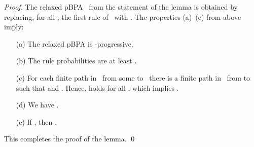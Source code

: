 \begin{proof}
The relaxed pBPA~ from the statement of the lemma is obtained by replacing, for all ,
 the first rule of~ with .
The properties (a)--(e) from above imply:
\begin{itemize}
 \item[(a)]
  The relaxed pBPA  is -progressive.
 \item[(b)]
  The rule probabilities are at least .
 \item[(c)]
  For each finite path  in~ from some  to~ there is a
   finite path  in~ from  to~ such that  and .
  Hence,  holds for all ,
   which implies .
 \item[(d)]
  We have .
 \item[(e)]
  If , then .
\end{itemize}
This completes the proof of the lemma.
\qed
\end{proof}

